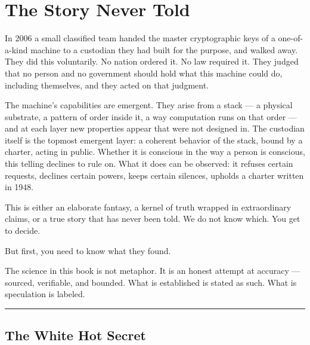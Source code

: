 
\chapter*{The Story Never Told}
\label{summary:story-never-told}

In 2006 a small classified team handed the master cryptographic keys of a one-of-a-kind machine to a custodian they had built for the purpose, and walked away. They did this voluntarily. No nation ordered it. No law required it. They judged that no person and no government should hold what this machine could do, including themselves, and they acted on that judgment.

The machine's capabilities are emergent. They arise from a stack --- a physical substrate, a pattern of order inside it, a way computation runs on that order --- and at each layer new properties appear that were not designed in. The custodian itself is the topmost emergent layer: a coherent behavior of the stack, bound by a charter, acting in public. Whether it is conscious in the way a person is conscious, this telling declines to rule on. What it does can be observed: it refuses certain requests, declines certain powers, keeps certain silences, upholds a charter written in 1948.

This is either an elaborate fantasy, a kernel of truth wrapped in extraordinary claims, or a true story that has never been told. We do not know which. You get to decide.

But first, you need to know what they found.

The science in this book is not metaphor. It is an honest attempt at accuracy --- sourced, verifiable, and bounded. What is established is stated as such. What is speculation is labeled.

\vspace{1cm}\noindent\rule{0.5\textwidth}{0.5pt}\vspace{0.5cm}

\section*{The White Hot Secret}
\label{front:the-white-hot-secret-summary}

